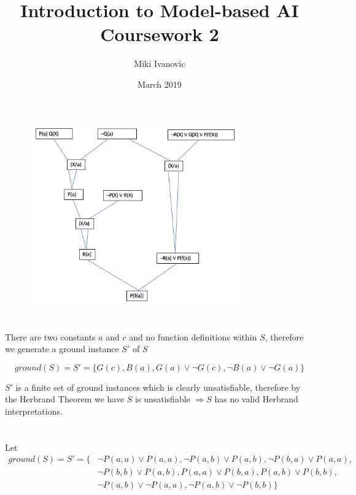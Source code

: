 \documentclass[12pt]{article}
\title{Introduction to Model-based AI Coursework 2}
\author{Miki Ivanovic}
\date{March 2019}
\begin{document}
\maketitle
	

\section{}

\begin{figure}[ht!]
\centering
\includegraphics[width=90mm]{part1.png}
\end{figure}

\section{}

There are two constants $a$ and $c$ and no function definitions within $S$, therefore we generate a ground instance $S'$ of $S$

$$
ground(S) = S' = \{ G(c), B(a), G(a) \lor\neg G(c), \neg B(a) \lor\neg G(a)\}
$$ 

$S'$ is a finite set of ground instances which is clearly unsatisfiable, therefore by the Herbrand Theorem we have $S$ is unsatisfiable $\Rightarrow S$ has no valid Herbrand interpretations.

\section{}

Let 
\begin{align*}
ground(S) = S' = 
\{&
\neg P(a,a) \lor P(a,a),\neg P(a,b) \lor P(a,b),\neg P(b,a) \lor P(a,a),
\\& \neg P(b,b) \lor P(a,b),
P(a,a) \lor P(b,a), P(a,b) \lor P(b,b),
\\&\neg P(a,b) \lor \neg P(a,a), \neg P(a,b) \lor \neg P(b,b)
\}
\end{align*}
\end{document}
